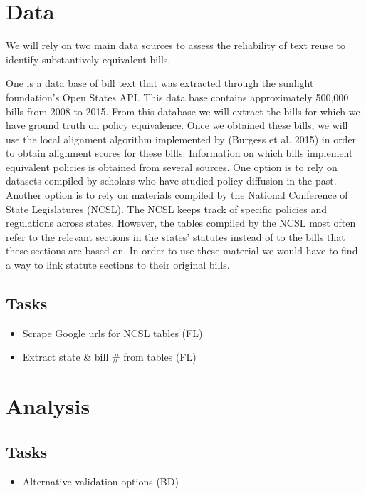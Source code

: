 \documentclass[12pt]{article} %
\begin{document}
\section{Data}

We will rely on two main data sources to assess the reliability of text reuse to
identify substantively equivalent bills. 

One is a data base of bill text that was extracted through the sunlight
foundation's Open States API. This data base contains approximately 500,000
bills from 2008 to 2015. From this database we will extract the bills for which we
have ground truth on policy equivalence. 
Once we obtained these bills, we will use the local alignment algorithm
implemented by (Burgess et al. 2015) in order to obtain alignment scores for
these bills. 
Information on which bills implement equivalent policies is obtained from
several sources. One option is to rely on datasets compiled by scholars who have
studied policy diffusion in the past. Another option is to rely on materials
compiled by the National Conference of State Legislatures (NCSL). The NCSL keeps
track of specific policies and regulations across states. However, the tables
compiled by the NCSL most often refer to the relevant sections in the states'
statutes instead of to the bills that these sections are based on. In order to
use these material we would have to find a way to link statute sections to their
original bills. 


\subsection{Tasks}
\begin{itemize}
\item Scrape Google urls for NCSL tables (FL)
\item Extract state  \& bill \# from tables (FL)
\end{itemize}

\section{Analysis}


\subsection{Tasks}
\begin{itemize}
\item Alternative validation options (BD)
\end{itemize}




\end{document}
